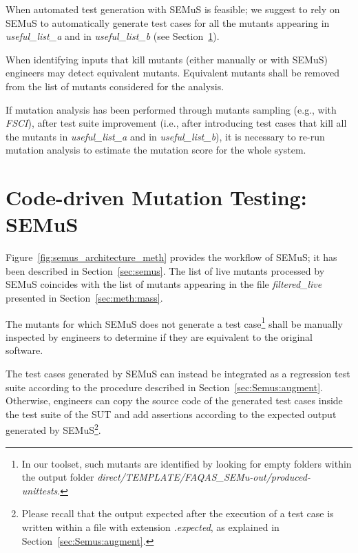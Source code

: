 When automated test generation with SEMuS is feasible; we suggest to rely on SEMuS to automatically generate test cases for all the mutants appearing in \emph{useful\_list\_a} and in \emph{useful\_list\_b} (see Section~\ref{sec:meth:semus}).

When identifying inputs that kill mutants (either manually or with SEMuS) engineers may detect equivalent mutants. Equivalent mutants shall be removed from the list of mutants considered for the analysis.

If mutation analysis has been performed through mutants sampling (e.g., with \emph{FSCI}), after test suite improvement (i.e., after introducing test cases that kill all the mutants in \emph{useful\_list\_a} and in \emph{useful\_list\_b}), it is necessary to re-run mutation analysis to estimate the mutation score for the whole system.

\clearpage
\section{Code-driven Mutation Testing: SEMuS}
\label{sec:meth:semus}

Figure~\ref{fig:semus_architecture_meth} provides the workflow of SEMuS; it has been described in Section~\ref{sec:semus}. The list of live mutants processed by SEMuS coincides with the list of mutants appearing in the file \emph{filtered\_live} presented in Section~\ref{sec:meth:mass}.

The mutants for which SEMuS does not generate a test case\footnote{In our toolset, such mutants are identified by looking for empty folders within the output folder \emph{direct/TEMPLATE/FAQAS\_SEMu-out/produced-unittests}.} shall be manually inspected by engineers to determine if they are equivalent to the original software.

The test cases generated by SEMuS can instead be integrated as a regression test suite according to the  procedure described in Section~\ref{sec:Semus:augment}. Otherwise, engineers can copy the source code of the generated test cases inside the test suite of the SUT and add assertions according to the expected output generated by SEMuS\footnote{Please recall that the output expected after the execution of a test case is written within a file with extension \emph{.expected}, as explained in Section~\ref{sec:Semus:augment}.}.

